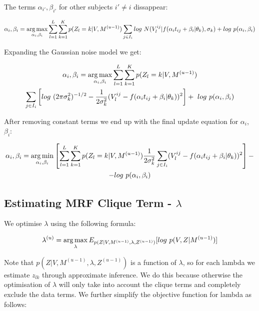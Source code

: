 The terms $\alpha_{i'}, \beta_{i'}$ for other subjects $i' \neq i$ dissappear:

\begin{equation}
 \alpha_i, \beta_i = \operatorname*{arg\,max}_{\alpha_i, \beta_i} \sum_{l=1}^L \sum_{k = 1}^K p(Z_l = k | V, M^{(u-1)}) \sum_{j \in I_i} log\ N(V_l^{ij} | f(\alpha_{i} t_{ij} + \beta_{i} | \theta_{k}), \sigma_{k}) + log\ p(\alpha_i, \beta_i)
\end{equation}

Expanding the Gaussian noise model we get:

\begin{multline}
 \alpha_i, \beta_i = \operatorname*{arg\,max}_{\alpha_i, \beta_i} \sum_{l=1}^L \sum_{k = 1}^K p(Z_l = k | V, M^{(u-1)}) \\ \sum_{j \in I_i} \left[ log\ (2 \pi \sigma_k^2)^{-1/2} - \frac{1}{2\sigma_k^2}(V_l^{ij} - f(\alpha_i t_{ij} + \beta_i | \theta_k))^2 \right] + \ log\ p(\alpha_i, \beta_i)
\end{multline}

After removing constant terms we end up with the final update equation for $\alpha_i$, $\beta_i$:

\begin{multline}
 \alpha_i, \beta_i = \operatorname*{arg\,min}_{\alpha_i, \beta_i}  \left[ \sum_{l=1}^L \sum_{k=1}^K p(Z_l = k | V, M^{(u-1)}) \frac{1}{2\sigma_k^2} \sum_{j \in I_i} (V_l^{ij} - f(\alpha_i t_{ij} + \beta_i | \theta_k))^2\right] - \\ - log\ p(\alpha_i, \beta_i)
\end{multline}

\subsection{Estimating MRF Clique Term - $\lambda$}

We optimise $\lambda$ using the following formula:

\begin{equation}
\lambda^{(u)} = \argmax_{\lambda} E_{p(Z|V, M^{(u-1)}, \lambda, Z^{(u-1)})}[log\ p(V,Z|M^{(u-1)})]
\end{equation}

Note that $p(Z|V, M^{(u-1)}, \lambda, Z^{(u-1)})$ is a function of $\lambda$, so for each lambda we estimate $z_{lk}$ through approximate inference. We do this because otherwise the optimisation of $\lambda$ will only take into account the clique terms and completely exclude the data terms. We further simplify the objective function for lambda as follows:

